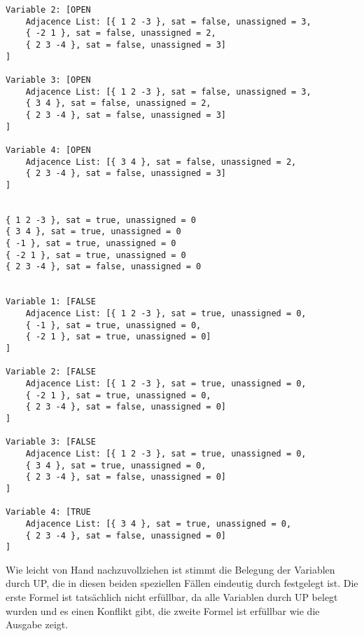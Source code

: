 \documentclass[a4paper,10pt]{article}
\begin{document}
\begin{verbatim}
Variable 2: [OPEN 
	Adjacence List: [{ 1 2 -3 }, sat = false, unassigned = 3, 
	{ -2 1 }, sat = false, unassigned = 2, 
	{ 2 3 -4 }, sat = false, unassigned = 3]
]

Variable 3: [OPEN 
	Adjacence List: [{ 1 2 -3 }, sat = false, unassigned = 3, 
	{ 3 4 }, sat = false, unassigned = 2, 
	{ 2 3 -4 }, sat = false, unassigned = 3]
]

Variable 4: [OPEN 
	Adjacence List: [{ 3 4 }, sat = false, unassigned = 2, 
	{ 2 3 -4 }, sat = false, unassigned = 3]
]


{ 1 2 -3 }, sat = true, unassigned = 0
{ 3 4 }, sat = true, unassigned = 0
{ -1 }, sat = true, unassigned = 0
{ -2 1 }, sat = true, unassigned = 0
{ 2 3 -4 }, sat = false, unassigned = 0


Variable 1: [FALSE 
	Adjacence List: [{ 1 2 -3 }, sat = true, unassigned = 0, 
	{ -1 }, sat = true, unassigned = 0, 
	{ -2 1 }, sat = true, unassigned = 0]
]

Variable 2: [FALSE 
	Adjacence List: [{ 1 2 -3 }, sat = true, unassigned = 0, 
	{ -2 1 }, sat = true, unassigned = 0, 
	{ 2 3 -4 }, sat = false, unassigned = 0]
]

Variable 3: [FALSE 
	Adjacence List: [{ 1 2 -3 }, sat = true, unassigned = 0, 
	{ 3 4 }, sat = true, unassigned = 0, 
	{ 2 3 -4 }, sat = false, unassigned = 0]
]

Variable 4: [TRUE 
	Adjacence List: [{ 3 4 }, sat = true, unassigned = 0, 
	{ 2 3 -4 }, sat = false, unassigned = 0]
]
\end{verbatim}
Wie leicht von Hand nachzuvollziehen ist stimmt die Belegung der Variablen durch UP, die in diesen beiden speziellen Fällen eindeutig durch festgelegt ist. Die erste Formel ist tatsächlich nicht erfüllbar, da alle Variablen durch UP belegt wurden und es einen Konflikt gibt, die zweite Formel ist erfüllbar wie die Ausgabe zeigt.
\end{document}
